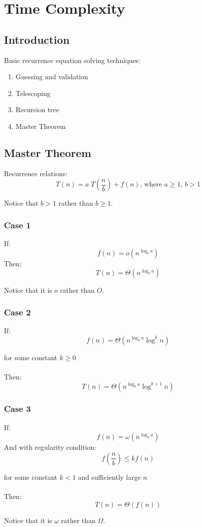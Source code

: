 \chapter{Time Complexity}

\section{Introduction}
Basic recurrence equation solving techniques:
\begin{enumerate}
\item Guessing and validation
\item Telescoping
\item Recursion tree
\item Master Theorem
\end{enumerate}

\section{Master Theorem}
Recurrence relations:
$$T(n) = a \; T\!\left(\frac{n}{b}\right) + f(n)\mbox{, where }a \geq 1 \mbox{, } b > 1$$

Notice that $b>1$ rather than $b\geq1$.

\subsection*{Case 1}
If:
$$f(n) = o(n^{\log_b a})$$
Then:
$$T(n) = \Theta(n^{\log_b a})$$

Notice that it is $o$ rather than $O$. 
\subsection*{Case 2}
If:
$$f(n) = \Theta(n^{\log_b a} \log^{k} n)$$

for some constant $k \geq 0$\\\\
Then:
$$
T(n) = \Theta(n^{\log_b a} \log^{k+1} n)
$$

\subsection*{Case 3}
If:
$$f(n) = \omega(n^{\log_b a})$$
And with regularity condition:
$$f(\frac{n}{b}) \le k f(n)$$

for some constant $k < 1$ and sufficiently large $n$\\\\
Then:
$$T\left(n \right) = \Theta\left(f(n) \right)$$

Notice that it is $\omega$ rather than $\Omega$. 
